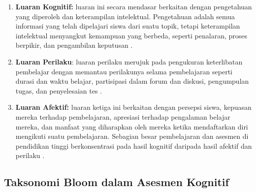 \begin{enumerate}
    \item \textbf{Luaran Kognitif:} luaran ini secara mendasar berkaitan dengan pengetahuan yang diperoleh dan
    keterampilan intelektual. Pengetahuan adalah semua informasi yang telah dipelajari
    siswa dari suatu topik, tetapi keterampilan intelektual menyangkut kemampuan yang
    berbeda, seperti penalaran, proses berpikir, dan pengambilan keputusan
    \autocite{Ihichr2024}.

    \item \textbf{Luaran Perilaku}: luaran perilaku merujuk pada pengukuran keterlibatan pembelajar dengan memantau
    perilakunya selama pembelajaran seperti durasi dan waktu belajar, partisipasi dalam
    forum dan diskusi, pengumpulan tugas, dan penyelesaian tes \autocite{Ihichr2024}.

    \item \textbf{Luaran Afektif:} luaran ketiga ini berkaitan dengan persepsi siswa, kepuasan mereka terhadap pembelajaran,
    apresiasi terhadap pengalaman belajar mereka, dan manfaat yang diharapkan oleh mereka
    ketika mendaftarkan diri mengikuti suatu pembelajaran. Sebagian besar pembelajaran dan
    asesmen di pendidikan tinggi berkonsentrasi pada hasil kognitif daripada hasil afektif
    dan perilaku \autocite{Ihichr2024}.
\end{enumerate}

\subsection{Taksonomi Bloom dalam Asesmen Kognitif}

